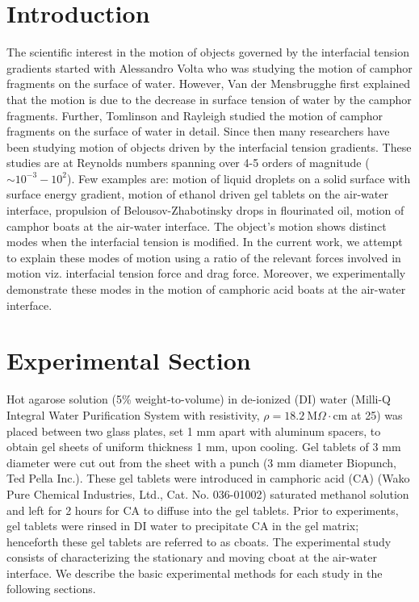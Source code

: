 \documentclass[journal=langd5, manuscript=article, layout=twocolumn]{achemso}
\begin{document}

\section{Introduction}
The scientific interest in the motion of objects governed by the interfacial tension gradients started with Alessandro Volta\cite{volta1787} who was studying the motion of camphor fragments on the surface of water. However, Van der Mensbrugghe\cite{mensbrugghe1869} first explained that the motion is due to the decrease in surface tension of water by the camphor fragments. Further, Tomlinson\cite{tomlinson1869} and Rayleigh\cite{rayleigh1889} studied the motion of camphor fragments on the surface of water in detail. Since then many researchers have been studying motion of objects driven by the interfacial tension gradients. These studies are at Reynolds numbers spanning over 4-5 orders of magnitude ($\sim 10^{-3} - 10^{2}$). Few examples are: motion of liquid droplets on a solid surface with surface energy gradient\cite{whitesides1992}, motion of ethanol driven gel tablets on the air-water interface\cite{velev2012}, propulsion of Belousov-Zhabotinsky drops in flourinated oil\cite{herminghaus2011}, motion of camphor boats at the air-water interface\cite{nakata2001}. The object's motion shows distinct modes when the interfacial tension is modified. In the current work, we attempt to explain these modes of motion using a ratio of the relevant forces involved in motion viz. interfacial tension force and drag force. Moreover, we experimentally demonstrate these modes in the motion of camphoric acid boats at the air-water interface. 

\section{Experimental Section}
Hot agarose solution (5\% weight-to-volume) in de-ionized (DI) water (Milli-Q Integral Water Purification System with resistivity, $\rho=18.2\ \mathrm{M}\Omega\cdot\mathrm{cm}$ at 25\celsius) was placed between two glass plates, set 1 mm apart with aluminum spacers, to obtain gel sheets of uniform thickness 1 mm, upon cooling. Gel tablets of 3 mm diameter were cut out from the sheet with a punch (3 mm diameter Biopunch, Ted Pella Inc.). These gel tablets were introduced in camphoric acid (CA) (Wako Pure Chemical Industries, Ltd., Cat. No. 036-01002) saturated methanol solution and left for 2 hours for CA to diffuse into the gel tablets. Prior to experiments, gel tablets were rinsed in DI water to precipitate CA in the gel matrix; henceforth these gel tablets are referred to as cboats. The experimental study consists of characterizing the stationary and moving cboat at the air-water interface. We describe the basic experimental methods for each study in the following sections. 
\end{document}
